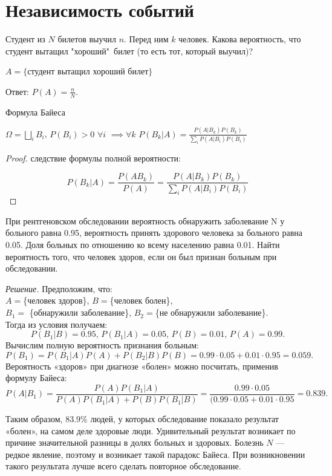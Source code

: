 \section{Независимость событий}

\begin{example}\label{lect04:ex1}
	Студент из $N$ билетов выучил $n$. Перед ним $k$ человек. Какова вероятность, что студент вытащил "хороший"\, билет (то есть тот, который выучил)?
	
	
	$A = \{$студент вытащил хороший билет$\}$
	
	Ответ: $P(A) = \frac{n}{N}$.
\end{example}

\begin{theorem}\label{lect04:th1} Формула Байеса
	
	
	$ \Omega = \bigsqcup \limits_{i} B_i$, $P(B_i) > 0$ $\forall i$ $\implies \forall k$ $P(B_k \vert A) = \frac{P(A \vert B_k) P(B_k)}{\sum \limits_{i}  P(A\vert B_i) P(B_i)}$
\end{theorem}
\begin{proof}
	следствие формулы полной вероятности: 
	
	$$P(B_k \vert A) = \frac{P(AB_k)}{P(A)} = \frac{P(A \vert B_k) P(B_k)}{\sum \limits_{i}  P(A\vert B_i) P(B_i)}$$
\end{proof}
\begin{example}\label{lect04:ex2}
	При рентгеновском обследовании вероятность обнаружить заболевание N у больного равна 0.95, вероятность принять здорового человека за больного равна 0.05. Доля больных по отношению ко всему населению равна 0.01. Найти вероятность того, что человек здоров, если он был признан больным при обследовании. 
	
	
	\textit{Решение.}  Предположим, что:\\
	$A = $\{человек здоров\}, $B = $\{человек болен\},\\
	$B_1 =$ \{обнаружили заболевание\}, $B_2 =$\{не обнаружили заболевание\}.\\
	Тогда из условия получаем: 
	$$P(B_1 \vert B)=0.95,\, P(B_1 \vert A)=0.05,\, P(B)=0.01,\, P(A)=0.99.$$
	Вычислим полную вероятность признания больным:
	$$P(B_1) = P(B_1 \vert A)P(A)+P(B_2 \vert B)P(B) =  0.99 \cdot 0.05+0.01\cdot0.95=0.059.$$
	Вероятность «здоров» при диагнозе «болен» можно посчитать, применив формулу Байеса:
	$$P(A \vert B_1) =\frac{P(A)P(B_1 \vert A)}{P(A)P(B_1 \vert A) + P(B)P(B_1 \vert B)} = \frac{0.99 \cdot 0.05}{(0.99 \cdot 0.05+0.01\cdot 0.95}=0.839.$$
	
	Таким образом, $83.9\%$ людей, у которых обследование показало результат «болен», на самом деле здоровые люди. Удивительный результат возникает по причине значительной разницы в долях больных и здоровых. Болезнь $N$ — редкое явление, поэтому и возникает такой парадокс Байеса. При возникновении такого результата лучше всего сделать повторное обследование.
\end{example}
